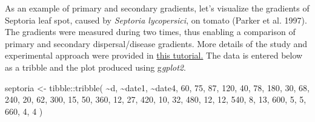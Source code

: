 \documentclass[
  letterpaper,
  DIV=11,
  numbers=noendperiod]{scrreprt}
\newenvironment{Shaded}{\begin{snugshade}}{\end{snugshade}}
\newcommand{\DecValTok}[1]{\textcolor[rgb]{0.68,0.00,0.00}{#1}}
\newcommand{\FunctionTok}[1]{\textcolor[rgb]{0.28,0.35,0.67}{#1}}
\newcommand{\NormalTok}[1]{\textcolor[rgb]{0.00,0.23,0.31}{#1}}
\newcommand{\OtherTok}[1]{\textcolor[rgb]{0.00,0.23,0.31}{#1}}
\newcommand{\SpecialCharTok}[1]{\textcolor[rgb]{0.37,0.37,0.37}{#1}}
\begin{document}
As an example of primary and secondary gradients, let's visualize the
gradients of Septoria leaf spot, caused by \emph{Septoria lycopersici},
on tomato (Parker et al. 1997). The gradients were measured during two
times, thus enabling a comparison of primary and secondary
dispersal/disease gradients. More details of the study and experimental
approach were provided in
\href{https://www.apsnet.org/edcenter/disimpactmngmnt/topc/EcologyAndEpidemiologyInR/ModelingDispersalGradients/Pages/PrimaryandSecondaryGradients.aspx}{this
tutorial.} The data is entered below as a tribble and the plot produced
using g\emph{gplot2}.

\begin{Shaded}
\begin{Highlighting}[]
\NormalTok{septoria }\OtherTok{\textless{}{-}} 
\NormalTok{tibble}\SpecialCharTok{::}\FunctionTok{tribble}\NormalTok{(}
 \SpecialCharTok{\textasciitilde{}}\NormalTok{d, }\SpecialCharTok{\textasciitilde{}}\NormalTok{date1, }\SpecialCharTok{\textasciitilde{}}\NormalTok{date4,}
 \DecValTok{60}\NormalTok{,     }\DecValTok{75}\NormalTok{,    }\DecValTok{87}\NormalTok{,}
 \DecValTok{120}\NormalTok{,    }\DecValTok{40}\NormalTok{,    }\DecValTok{78}\NormalTok{,}
 \DecValTok{180}\NormalTok{,    }\DecValTok{30}\NormalTok{,    }\DecValTok{68}\NormalTok{,}
 \DecValTok{240}\NormalTok{,    }\DecValTok{20}\NormalTok{,    }\DecValTok{62}\NormalTok{,}
 \DecValTok{300}\NormalTok{,    }\DecValTok{15}\NormalTok{,    }\DecValTok{50}\NormalTok{,}
 \DecValTok{360}\NormalTok{,    }\DecValTok{12}\NormalTok{,    }\DecValTok{27}\NormalTok{,}
 \DecValTok{420}\NormalTok{,    }\DecValTok{10}\NormalTok{,    }\DecValTok{32}\NormalTok{,}
 \DecValTok{480}\NormalTok{,    }\DecValTok{12}\NormalTok{,    }\DecValTok{12}\NormalTok{,}
 \DecValTok{540}\NormalTok{,     }\DecValTok{8}\NormalTok{,    }\DecValTok{13}\NormalTok{,}
 \DecValTok{600}\NormalTok{,     }\DecValTok{5}\NormalTok{,     }\DecValTok{5}\NormalTok{,}
 \DecValTok{660}\NormalTok{,     }\DecValTok{4}\NormalTok{,     }\DecValTok{4}
\NormalTok{                )}


\end{Highlighting}
\end{Shaded}
\end{document}
